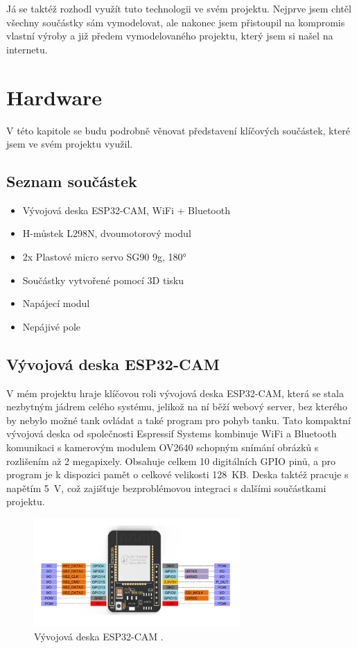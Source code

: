 \documentclass[12pt, a4paper,
oneside
openany
]{report}
\begin{document}
\noindent Já se taktéž rozhodl využít tuto technologii ve svém projektu. Nejprve jsem chtěl všechny součástky sám vymodelovat, ale nakonec jsem přistoupil na kompromis vlastní výroby a již předem vymodelovaného projektu, který jsem si našel na internetu.

\section{Hardware}
\label{sec:zakladni_struktura}

V této kapitole se budu podrobně věnovat představení klíčových součástek, které jsem ve svém projektu využil.

\newpage

\subsection{Seznam součástek}

\begin{itemize}
  \item Vývojová deska ESP32-CAM, WiFi + Bluetooth
  \item H-můstek L298N, dvoumotorový modul
  \item 2x Plastové micro servo SG90 9g, 180°
  \item Součástky vytvořené pomocí 3D tisku
  \item Napájecí modul
  \item Nepájivé pole
\end{itemize}

\subsection{Vývojová deska ESP32-CAM}
\noindent V mém projektu hraje klíčovou roli vývojová deska ESP32-CAM, která se stala nezbytným jádrem celého systému, jelikož na ní běží webový server, bez kterého by nebylo možné tank ovládat a také program pro pohyb tanku. Tato kompaktní vývojová deska od společnosti Espressif Systems kombinuje WiFi a Bluetooth komunikaci s kamerovým modulem OV2640 schopným snímání obrázků s rozlišením až 2 megapixely. Obsahuje celkem 10 digitálních GPIO pinů, a pro program je k dispozici pamět o celkové velikosti 128~KB. Deska taktéž pracuje s napětím 5~V, což zajišťuje bezproblémovou integraci s dalšími součástkami projektu. 

	\begin{figure}[ht]
		\centering 
		\includegraphics[width=0.7\textwidth]{image/esp-detail} %
		\caption{Vývojová deska ESP32-CAM \cite{ESP32}.} 
	\end{figure}
\end{document}
